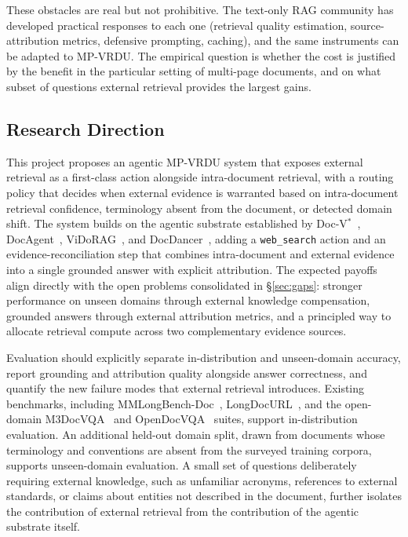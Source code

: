 \documentclass[11pt]{article}
\begin{document}
These obstacles are real but not prohibitive. The text-only RAG community has developed practical responses to each one (retrieval quality estimation, source-attribution metrics, defensive prompting, caching), and the same instruments can be adapted to MP-VRDU. The empirical question is whether the cost is justified by the benefit in the particular setting of multi-page documents, and on what subset of questions external retrieval provides the largest gains.

\subsection{Research Direction}
This project proposes an agentic MP-VRDU system that exposes external retrieval as a first-class action alongside intra-document retrieval, with a routing policy that decides when external evidence is warranted based on intra-document retrieval confidence, terminology absent from the document, or detected domain shift. The system builds on the agentic substrate established by Doc-V$^{*}$~\cite{zheng2026docvstar}, DocAgent~\cite{sun2025docagent}, ViDoRAG~\cite{wang2025vidorag}, and DocDancer~\cite{zhang2026docdancer}, adding a \texttt{web\_search} action and an evidence-reconciliation step that combines intra-document and external evidence into a single grounded answer with explicit attribution. The expected payoffs align directly with the open problems consolidated in \S\ref{sec:gaps}: stronger performance on unseen domains through external knowledge compensation, grounded answers through external attribution metrics, and a principled way to allocate retrieval compute across two complementary evidence sources.

Evaluation should explicitly separate in-distribution and unseen-domain accuracy, report grounding and attribution quality alongside answer correctness, and quantify the new failure modes that external retrieval introduces. Existing benchmarks, including MMLongBench-Doc~\cite{ma2024mmlongbench}, LongDocURL~\cite{deng2025longdocurl}, and the open-domain M3DocVQA~\cite{cho2025m3docvqa} and OpenDocVQA~\cite{tanaka2025vdocrag} suites, support in-distribution evaluation. An additional held-out domain split, drawn from documents whose terminology and conventions are absent from the surveyed training corpora, supports unseen-domain evaluation. A small set of questions deliberately requiring external knowledge, such as unfamiliar acronyms, references to external standards, or claims about entities not described in the document, further isolates the contribution of external retrieval from the contribution of the agentic substrate itself.
\end{document}
